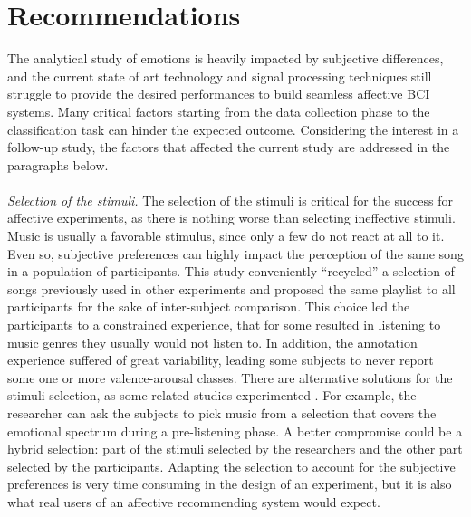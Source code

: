 \section{Recommendations}
The analytical study of emotions is heavily impacted by subjective differences, and the current state of art technology and signal processing techniques still struggle to provide the desired performances to build seamless affective \ac{BCI} systems. Many critical factors starting from the data collection phase to the classification task can hinder the expected outcome. Considering the interest in a follow-up study, the factors that affected the current study are addressed in the paragraphs below. 
\\
\\
\emph{Selection of the stimuli.} The selection of the stimuli is critical for the success for affective experiments, as there is nothing worse than selecting ineffective stimuli. Music is usually a favorable stimulus, since only a few do not react at all to it. Even so, subjective preferences can highly impact the perception of the same song in a population of participants. This study conveniently “recycled” a selection of songs previously used in other experiments and proposed the same playlist to all participants for the sake of inter-subject comparison. This choice led the participants to a constrained experience, that for some resulted in listening to music genres they usually would not listen to. In addition, the annotation experience suffered of great variability, leading some subjects to never report some one or more valence-arousal classes. There are alternative solutions for the stimuli selection, as some related studies experimented \cite{thammasan_continuous_2016}. For example, the researcher can ask the subjects to pick music from a selection that covers the emotional spectrum during a pre-listening phase. A better compromise could be a hybrid selection: part of the stimuli selected by the researchers and the other part selected by the participants. Adapting the selection to account for the subjective preferences is very time consuming in the design of an experiment, but it is also what real users of an affective recommending system would expect.
\\
\\
